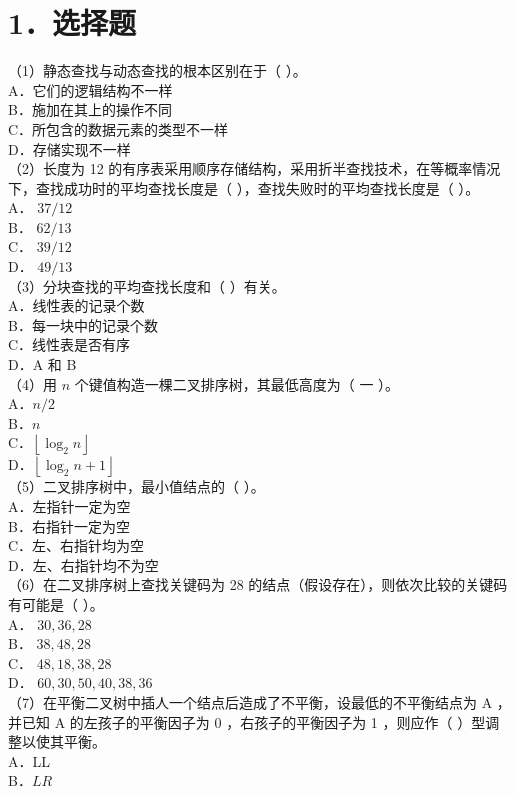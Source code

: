 \documentclass[10pt]{article}
\begin{document}
\section*{1．选择题}
（1）静态查找与动态查找的根本区别在于（ ）。\\
A．它们的逻辑结构不一样\\
B．施加在其上的操作不同\\
C．所包含的数据元素的类型不一样\\
D．存储实现不一样\\
（2）长度为 12 的有序表采用顺序存储结构，采用折半查找技术，在等概率情况下，查找成功时的平均查找长度是（ ），查找失败时的平均查找长度是（ ）。\\
A． $37 / 12$\\
B． $62 / 13$\\
C． $39 / 12$\\
D． $49 / 13$\\
（3）分块查找的平均查找长度和（ ）有关。\\
A．线性表的记录个数\\
B．每一块中的记录个数\\
C．线性表是否有序\\
D．A 和 B\\
（4）用 $n$ 个键值构造一棵二叉排序树，其最低高度为（ 一 ）。\\
A．$n / 2$\\
B．$n$\\
C．$\left\lfloor\log _{2} n\right\rfloor$\\
D．$\left\lfloor\log _{2} n+1\right\rfloor$\\
（5）二叉排序树中，最小值结点的（ ）。\\
A．左指针一定为空\\
B．右指针一定为空\\
C．左、右指针均为空\\
D．左、右指针均不为空\\
（6）在二叉排序树上查找关键码为 28 的结点（假设存在），则依次比较的关键码有可能是（ ）。\\
A． $30,36,28$\\
B． $38,48,28$\\
C． $48,18,38,28$\\
D． $60,30,50,40,38,36$\\
（7）在平衡二叉树中插人一个结点后造成了不平衡，设最低的不平衡结点为 A ，并已知 A 的左孩子的平衡因子为 0 ，右孩子的平衡因子为 1 ，则应作（ ）型调整以使其平衡。\\
A．LL\\
B．$L R$\\
\end{document}
